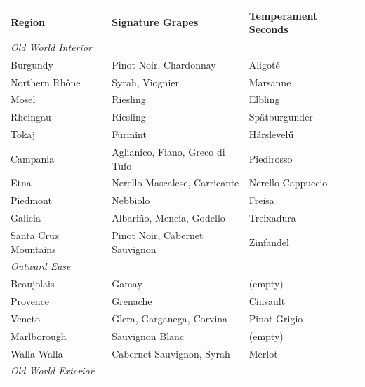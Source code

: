 \documentclass[11pt]{article}
\begin{document}
\begin{small}
\begin{longtable}{p{3.5cm} p{6cm} p{3cm}}
\toprule
\textbf{Region} & \textbf{Signature Grapes} & \textbf{Temperament Seconds} \\
\midrule
\endhead
\multicolumn{3}{l}{\textit{Old World Interior}} \\
Burgundy             & Pinot Noir, Chardonnay                                       & Aligot\'e \\
Northern Rh\^one     & Syrah, Viognier                                              & Marsanne \\
Mosel                & Riesling                                                     & Elbling \\
Rheingau             & Riesling                                                     & Spätburgunder \\
Tokaj                & Furmint                                                      & Hárslevelű \\
Campania             & Aglianico, Fiano, Greco di Tufo                              & Piedirosso \\
Etna                 & Nerello Mascalese, Carricante                                & Nerello Cappuccio \\
Piedmont             & Nebbiolo                                                     & Freisa \\
Galicia              & Albari\~no, Menc\'ia, Godello                                & Treixadura \\
Santa Cruz Mountains & Pinot Noir, Cabernet Sauvignon                               & Zinfandel \\
\midrule
\multicolumn{3}{l}{\textit{Outward Ease}} \\
Beaujolais           & Gamay                                                        & (empty) \\
Provence             & Grenache                                                     & Cinsault \\
Veneto               & Glera, Garganega, Corvina                                    & Pinot Grigio \\
Marlborough          & Sauvignon Blanc                                              & (empty) \\
Walla Walla          & Cabernet Sauvignon, Syrah                                    & Merlot \\
\midrule
\multicolumn{3}{l}{\textit{Old World Exterior}} \\

\end{longtable}
\end{small}
\end{document}
